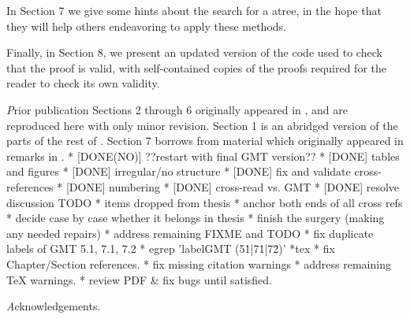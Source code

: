 In Section 7 we give some hints about the search for a atree,
in the hope that they will help others endeavoring to apply these methods.

Finally, in Section 8, we present an updated version of
the code used to check that the proof is valid,
with self-contained copies of the proofs required for the reader
to check its own validity.

{\textit Prior publication}
Sections 2 through 6 originally appeared in \cite{GMT},
and are reproduced here with only minor revision.
Section 1 is an abridged version of the parts of the rest of \cite{GMT}.
Section 7 borrows from material which originally appeared in remarks in \cite{GMT}.
 * [DONE(NO)] ??restart with final GMT version??
 * [DONE] tables and figures
 * [DONE] irregular/no structure
 * [DONE] fix and validate cross-references
 * [DONE] numbering
 * [DONE] cross-read vs. GMT
 * [DONE] resolve discussion TODO
 * items dropped from thesis
   * anchor both ends of all cross refs
   * decide case by case whether it belongs in thesis
   * finish the surgery (making any needed repairs)
 * address remaining FIXME and TODO
 * fix duplicate labels of GMT 5.1, 7.1, 7.2
   * egrep 'label{GMT (5\.1|7\.1|7\.2)}' *tex
 * fix Chapter/Section references.
 * fix missing citation warnings
 * address remaining TeX warnings.
 * review PDF & fix bugs until satisfied.

{\textit Acknowledgements}.
